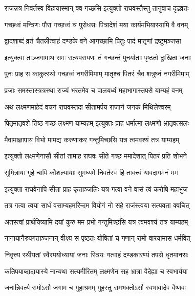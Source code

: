 \twolineshloka
{राजन्नत्र निवर्तस्व विहायास्मान् क्व गच्छसि}
{इत्युक्तो राघवस्तैस्तु तानुवाच दृढव्रतः} %

\twolineshloka
{गच्छध्वं मन्त्रिणः पौरा गच्छध्वं च पुरोधसः}
{पित्रादेशं मया कार्यमभियास्यामि वै वनम्} %

\twolineshloka
{द्वादशाब्दं व्रतं चैतन्नीत्वाहं दण्डके वने}
{आगच्छामि पितुः पादं मातृणां द्रष्टुमञ्जसा} %

\twolineshloka
{इत्युक्त्वा ताञ्जगामाथ रामः सत्यपरायणः}
{तं गच्छन्तं पुनर्याताः पृष्ठतो दुःखिता जनाः} %

\twolineshloka
{पुनः प्राह स काकुत्स्थो गच्छध्वं नगरीमिमाम्}
{मातृश्च पितरं चैव शत्रुघ्नं नगरीमिमाम्} %

\twolineshloka
{प्रजाः समस्तास्त्रत्रस्था राज्यं भरतमेव च}
{पालयध्वं महाभागास्तपसे याम्यहं वनम्} %

\twolineshloka
{अथ लक्ष्मणमाहेदं वचनं राघवस्तदा}
{सीतामर्पय राजानं जनकं मिथिलेश्वरम्} %

\twolineshloka
{पितृमातृवशे तिष्ठ गच्छ लक्ष्मण याम्यहम्}
{इत्युक्तः प्राह धर्मात्मा लक्ष्मणो भ्रातृवत्सलः} %

\twolineshloka
{मैवामाज्ञापाय विभो मामद्य करुणाकर}
{गन्तुमिच्छसि यत्र त्वमवश्यं तत्र याम्यहम्} %

\twolineshloka
{इत्युक्तो लक्ष्मणेनासौ सीतां तामाह राघवः}
{सीते गच्छ ममादेशात् पितरं प्रति शोभने} %

\twolineshloka
{सुमित्राया गृहे चापि कौशल्यायाः सुमध्यमे}
{निवर्तस्व हि तावत्त्वं यावदागमनं मम} %

\twolineshloka
{इत्युक्ता राघवेनापि सीता प्राह कृताञ्जलिः}
{यत्र गत्वा वने वासं त्वं करोषि महाभुज} %

\twolineshloka
{तत्र गत्वा त्वया सार्धं वसाम्यहमरिन्दम}
{वियोगं नो सहे राजंस्त्वया सत्यवता क्वचित्} %

\twolineshloka
{अतस्त्वां प्रार्थयिष्यामि दयां कुरु मम प्रभो}
{गन्तुमिच्छसि यत्र त्वमवश्यं तत्र याम्यहम्} %

\twolineshloka
{नानायानैरुपगताञ्जनान् वीक्ष्य स पृष्ठतः}
{योषितां च गणान् रामो वारयामास धर्मवित्} %

\twolineshloka
{निवृत्त्य स्थीयतां स्वैरमयोध्यायां जनाः स्त्रियः}
{गत्वाहं दण्डकारण्यं तपसे धृतमानसः} %

\twolineshloka
{कतिपयाब्दादायास्ये नान्यथा सत्यमीरितम्}
{लक्ष्मणेन सह भ्रात्रा वैदेह्या च स्वभार्यया} %

\twolineshloka
{जनान्निवर्त्य रामोऽसौ जगाम च गुहाश्रमम्}
{गुहस्तु रामभक्तोऽसौ स्वभावादेव वैष्णवः} %

